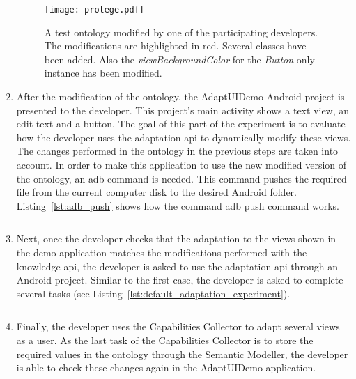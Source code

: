\begin{enumerate}
  \begin{figure}
  \centering
  \texttt{[image: protege.pdf]}
  \caption{A test ontology modified by one of the participating developers. 
  The modifications are highlighted in red. Several classes have been added. 
  Also the \textit{viewBackgroundColor} for the \textit{Button} only instance 
  has been modified.}
  \label{fig:protege}
  \end{figure}
  
  \item After the modification of the ontology, the AdaptUIDemo Android project 
  is presented to the developer. This project's main activity shows a text view, 
  an edit text and a button. The goal of this part of the experiment is to evaluate
  how the developer uses the adaptation \ac{api} to dynamically modify these views.
  The changes performed in the ontology in the previous steps are taken into account. 
  In order to make this application to use the new modified version of the ontology, 
  an \acs{adb} command is needed. This command pushes the required file from the 
  current computer disk to the desired Android folder. Listing~\ref{lst:adb_push} 
  shows how the command \acs{adb} push command works.
  
  \inputminted[linenos=true, fontsize=\footnotesize, frame=lines]{java}{5_experiments_and_results/adb_push.java}
  
  \item Next, once the developer checks that the adaptation to the views shown
  in the demo application matches the modifications performed with the knowledge 
  \ac{api}, the developer is asked to use the adaptation \ac{api} through an
  Android project. Similar to the first case, the developer is asked to complete
  several tasks (see Listing~\ref{lst:default_adaptation_experiment}).

  \inputminted[linenos=true, fontsize=\footnotesize, frame=lines]{java}{5_experiments_and_results/default_adaptation_experiment.java}
  
  \item Finally, the developer uses the Capabilities Collector to adapt several
  views as a user. As the last task of the Capabilities Collector is to store the
  required values in the ontology through the Semantic Modeller, the developer 
  is able to check these changes again in the AdaptUIDemo application.
  
\end{enumerate}



